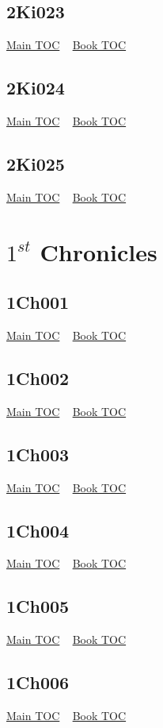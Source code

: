\documentclass{book}
\begin{document}
  \section{2Ki023}\hyperlink{toc}{Main TOC} ~ \hyperref[subsec:2Ki]{Book TOC} 
  \section{2Ki024}\hyperlink{toc}{Main TOC} ~ \hyperref[subsec:2Ki]{Book TOC} 
  \section{2Ki025}\hyperlink{toc}{Main TOC} ~ \hyperref[subsec:2Ki]{Book TOC} 
  \chapter{$1^{st}$ Chronicles} \label{subsec:1Ch} \begin{multicols}{2} \minitoc \end{multicols}
  \section{1Ch001}\hyperlink{toc}{Main TOC} ~ \hyperref[subsec:1Ch]{Book TOC} 
  \section{1Ch002}\hyperlink{toc}{Main TOC} ~ \hyperref[subsec:1Ch]{Book TOC} 
  \section{1Ch003}\hyperlink{toc}{Main TOC} ~ \hyperref[subsec:1Ch]{Book TOC} 
  \section{1Ch004}\hyperlink{toc}{Main TOC} ~ \hyperref[subsec:1Ch]{Book TOC} 
  \section{1Ch005}\hyperlink{toc}{Main TOC} ~ \hyperref[subsec:1Ch]{Book TOC} 
  \section{1Ch006}\hyperlink{toc}{Main TOC} ~ \hyperref[subsec:1Ch]{Book TOC} 
\end{document}
